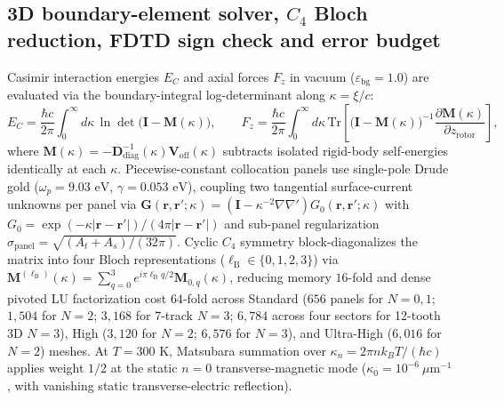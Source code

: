 \documentclass[11pt, a4paper]{article}
\begin{document}
\subsection*{3D boundary-element solver, $C_4$ Bloch reduction, FDTD sign check and error budget}
Casimir interaction energies $E_C$ and axial forces $F_z$ in vacuum ($\varepsilon_{\mathrm{bg}}=1.0$) are evaluated via the boundary-integral log-determinant along $\kappa = \xi/c$\cite{reid2013pra}:
\begin{equation}
E_C = \frac{\hbar c}{2\pi} \int_0^\infty d\kappa \, \ln\det\bigl(\mathbf{I} - \mathbf{M}(\kappa)\bigr),
\qquad
F_z = \frac{\hbar c}{2\pi} \int_0^\infty d\kappa \, \mathrm{Tr}\!\left[\bigl(\mathbf{I} - \mathbf{M}(\kappa)\bigr)^{-1} \frac{\partial \mathbf{M}(\kappa)}{\partial z_{\mathrm{rotor}}}\right],
\label{eq:methods_bem}
\end{equation}
where $\mathbf{M}(\kappa) = -\mathbf{D}_{\mathrm{diag}}^{-1}(\kappa)\mathbf{V}_{\mathrm{off}}(\kappa)$ subtracts isolated rigid-body self-energies identically at each $\kappa$. Piecewise-constant collocation panels use single-pole Drude gold ($\omega_p = 9.03\text{ eV}$, $\gamma = 0.053\text{ eV}$)\cite{rakic1998}, coupling two tangential surface-current unknowns per panel via $\mathbf{G}(\mathbf{r},\mathbf{r}';\kappa) = (\mathbf{I} - \kappa^{-2}\nabla\nabla')G_0(\mathbf{r},\mathbf{r}';\kappa)$ with $G_0 = \exp(-\kappa |\mathbf{r}-\mathbf{r}'|)/(4\pi |\mathbf{r}-\mathbf{r}'|)$ and sub-panel regularization $\sigma_{\mathrm{panel}} = \sqrt{(A_t+A_s)/(32\pi)}$. Cyclic $C_4$ symmetry block-diagonalizes the matrix into four Bloch representations ($\ell_{\mathrm{B}} \in \{0,1,2,3\}$) via $\mathbf{M}^{(\ell_{\mathrm{B}})}(\kappa) = \sum_{q=0}^{3} e^{i\pi \ell_{\mathrm{B}} q/2}\mathbf{M}_{0,q}(\kappa)$, reducing memory $16$-fold and dense pivoted LU factorization cost $64$-fold across Standard ($656$ panels for $N=0,1$; $1{,}504$ for $N=2$; $3{,}168$ for 7-track $N=3$; $6{,}784$ across four sectors for 12-tooth 3D $N=3$), High ($3{,}120$ for $N=2$; $6{,}576$ for $N=3$), and Ultra-High ($6{,}016$ for $N=2$) meshes. At $T = 300\text{ K}$, Matsubara summation over $\kappa_n = 2\pi n k_B T/(\hbar c)$ applies weight $1/2$ at the static $n=0$ transverse-magnetic mode ($\kappa_0 = 10^{-6}\ \mu\text{m}^{-1}$, with vanishing static transverse-electric reflection).
\end{document}
